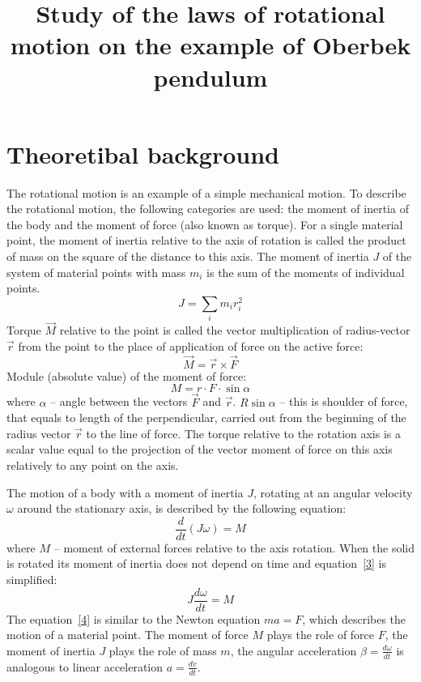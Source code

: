 \documentclass{LabWorkEng}
\title{Study of the laws of rotational motion on the example of Oberbek pendulum}
\begin{document}
\writedatatofile{\jobname}
\maketitle

\nocite{IrodovMechanics, BerkeleyMechanics, FLF1, Holyday}
\printbibliography

\section{Theoretibal background}

The rotational motion is an example of a simple mechanical motion. To describe the rotational motion, the following categories are used: the moment of inertia of the body and the moment of force (also known as torque). For a single material point, the moment of inertia relative to the axis of rotation is called the product of mass on the square of the distance to this axis. The moment of inertia $J$ of the system of material points with mass $m_i$ is the sum of the moments of individual points.
\begin{equation}\label{1}
	J = \sum\limits_i {{m_i}r_i^2}
\end{equation}
Torque $\vec M$ relative to the point is called the vector multiplication of radius-vector $\vec r$  from the point  to the place of application of force on the active force:
\begin{equation}\label{2}
	\vec M = \vec r \times \vec F
\end{equation}
Module (absolute value) of the moment of force:
\begin{equation}\label{2'}
	 M = r \cdot F \cdot \sin\alpha
\end{equation}
where $\alpha$ -- angle between the vectors $\vec F$  and $\vec r$. $R\sin\alpha$ -- this is shoulder of force, that equals to length of the perpendicular, carried out from the beginning of the radius vector $\vec r$  to the line of force.
The torque relative to the rotation axis is a scalar value equal to the projection of the vector moment of force  on this axis relatively to any point on the axis. 


The motion of a body with a moment of inertia $J$, rotating at an angular velocity $\omega$ around the stationary axis, is described by the following equation:
\begin{equation}\label{3}
	\frac{d}{{dt}}\left( {J\omega } \right) = M
\end{equation}
where $M$ -- moment of external forces relative to the axis rotation. When the solid is rotated its moment of inertia does not depend on time and equation~\eqref{3} is simplified:
\begin{equation}\label{4}
	 J\frac{{d\omega }}{{dt}} = M
\end{equation}
The equation~\eqref{4} is similar to the Newton equation $ma=F$, which describes the motion of a material point. The moment of force $M$ plays the role of force $F$, the moment of inertia $J$ plays the role of mass $m$, the angular acceleration $\beta = \frac{d\omega}{dt}$ is analogous to linear acceleration $a = \frac{dv}{dt}$.
\end{document}
